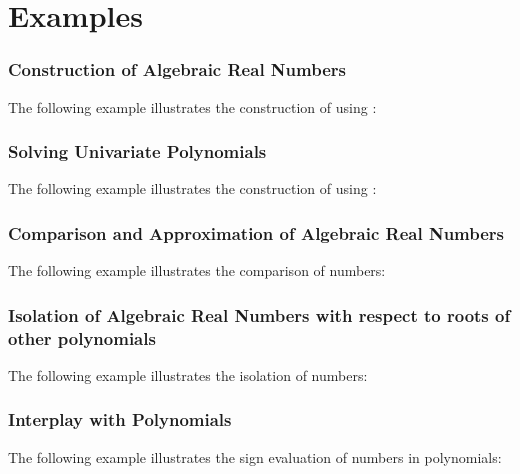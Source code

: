 \clearpage
\section{Examples}
\subsubsection{Construction of Algebraic Real Numbers }
The following example illustrates the construction of  
using :
{\small {}}

\clearpage
\subsubsection{Solving Univariate Polynomials}
The following example illustrates the construction of  
using : {\small {} }

\clearpage
\subsubsection{Comparison and Approximation of Algebraic Real Numbers \label{CGAL::AK1::EG::Compare_1} }

The following example illustrates the comparison of  numbers: 
{\small {}}

\clearpage
\subsubsection{Isolation of Algebraic Real Numbers with respect to roots of other polynomials \label{CGAL::AK1::EG::Isolate_1} }

The following example illustrates the isolation of  numbers: 
{\small {}}

\clearpage
\subsubsection{Interplay with Polynomials \label{CGAL::AK1::EG::Sign_at_1} }

The following example illustrates the sign evaluation of  numbers in polynomials:
{\small {}}

